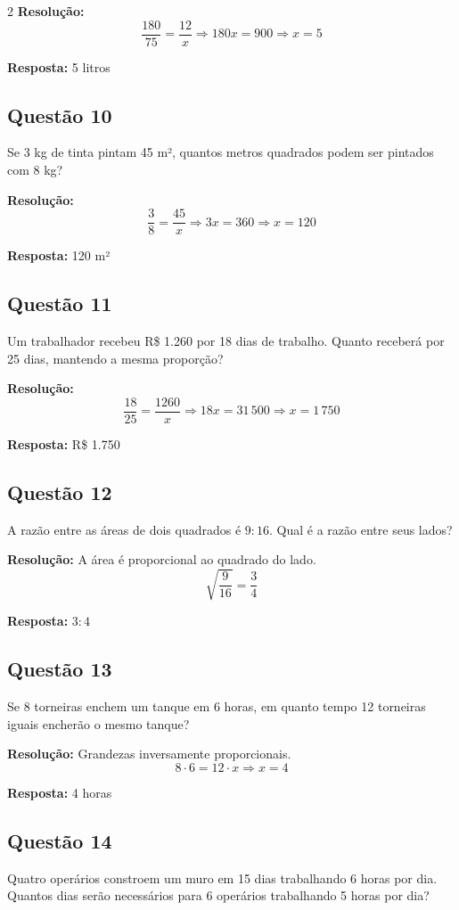 \documentclass[11pt]{article}
\begin{document}
\begin{multicols}{2}
\textbf{Resolução:}
\[
\frac{180}{75} = \frac{12}{x}
\Rightarrow 180x = 900
\Rightarrow x = 5
\]

\textbf{Resposta:} 5 litros

\subsection*{Questão 10}
Se 3 kg de tinta pintam 45 m², quantos metros quadrados podem ser pintados com 8 kg?

\textbf{Resolução:}
\[
\frac{3}{8} = \frac{45}{x}
\Rightarrow 3x = 360
\Rightarrow x = 120
\]

\textbf{Resposta:} 120 m²

\subsection*{Questão 11}
Um trabalhador recebeu R\$ 1.260 por 18 dias de trabalho. Quanto receberá por 25 dias, mantendo a mesma proporção?

\textbf{Resolução:}
\[
\frac{18}{25} = \frac{1260}{x}
\Rightarrow 18x = 31\,500
\Rightarrow x = 1\,750
\]

\textbf{Resposta:} R\$ 1.750

\subsection*{Questão 12}
A razão entre as áreas de dois quadrados é $9:16$. Qual é a razão entre seus lados?

\textbf{Resolução:}
A área é proporcional ao quadrado do lado.
\[
\sqrt{\frac{9}{16}} = \frac{3}{4}
\]

\textbf{Resposta:} $3:4$

\subsection*{Questão 13}
Se 8 torneiras enchem um tanque em 6 horas, em quanto tempo 12 torneiras iguais encherão o mesmo tanque?

\textbf{Resolução:}
Grandezas inversamente proporcionais.
\[
8 \cdot 6 = 12 \cdot x
\Rightarrow x = 4
\]

\textbf{Resposta:} 4 horas

\subsection*{Questão 14}
Quatro operários constroem um muro em 15 dias trabalhando 6 horas por dia. Quantos dias serão necessários para 6 operários trabalhando 5 horas por dia?


\end{multicols}
\end{document}
